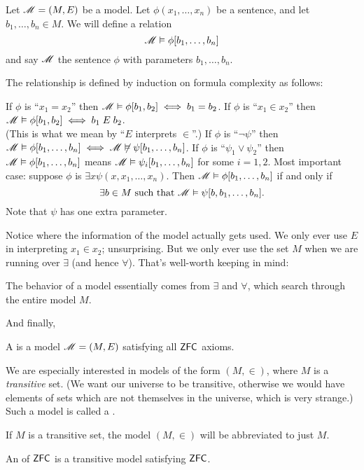 \begin{definition}
	Let $\mathscr M=(M,E)$ be a model.
	Let $\phi(x_1, \dots, x_n)$ be a sentence, and let $b_1, \dots, b_n \in M$.
	We will define a relation
	\[ \mathscr M \vDash \phi[b_1, \dots, b_n] \]
	and say $\mathscr M$  the sentence $\phi$ with parameters $b_1, \dots, b_n$.

	The relationship is defined by induction on formula complexity as follows:
	\begin{itemize}
		\ii If $\phi$ is ``$x_1=x_2$'' then $\mathscr M \vDash \phi[b_1, b_2] \iff b_1 = b_2$.
		\ii If $\phi$ is ``$x_1\in x_2$'' then $\mathscr M \vDash \phi[b_1, b_2] \iff b_1 \; E \; b_2$. \\
		(This is what we mean by ``$E$ interprets $\in$''.)
		\ii If $\phi$ is ``$\neg \psi$'' then
		$\mathscr M \vDash \phi[b_1, \dots, b_n] \iff \mathscr M \not\vDash \psi[b_1, \dots, b_n]$.
		\ii If $\phi$ is ``$\psi_1 \lor \psi_2$'' then $\mathscr M \vDash \phi[b_1, \dots, b_n]$
		means $\mathscr M \vDash \psi_i[b_1, \dots, b_n]$ for some $i=1,2$.
		\ii Most important case: suppose $\phi$ is $\exists x \psi(x,x_1, \dots, x_n)$.
		Then $\mathscr M \vDash \phi[b_1, \dots, b_n]$ if and only if 
		\[ \exists b \in M \text{ such that } \mathscr M \vDash \psi[b, b_1, \dots, b_n]. \]
		Note that $\psi$ has one extra parameter.
	\end{itemize}
\end{definition}
Notice where the information of the model actually gets used.
We only ever use $E$ in interpreting $x_1 \in x_2$; unsurprising.
But we only ever use the set $M$ when we are running over $\exists$ (and hence $\forall$).
That's well-worth keeping in mind:
\begin{moral}
	The behavior of a model essentially comes from $\exists$ and $\forall$,
	which search through the entire model $M$.
\end{moral}

And finally,
\begin{definition}
	A  is a model $\mathscr M = (M,E)$ satisfying all $\mathsf{ZFC}$ axioms.
\end{definition}

We are especially interested in models of the form $(M, \in)$, where $M$ is a \emph{transitive} set.
(We want our universe to be transitive,
otherwise we would have elements of sets which are not themselves
in the universe, which is very strange.)
Such a model is called a .
\begin{abuse}
	If $M$ is a transitive set, the model $(M, \in)$ will be abbreviated to just $M$.
\end{abuse}
\begin{definition}
	An  of $\mathsf{ZFC}$ is a transitive model satisfying $\mathsf{ZFC}$.
\end{definition}

